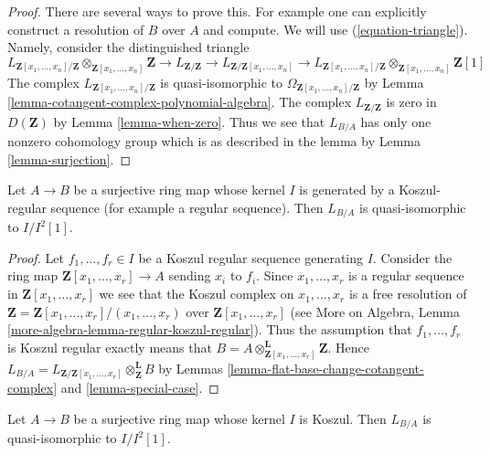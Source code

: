 \begin{proof}
There are several ways to prove this. For example one can explicitly construct
a resolution of $B$ over $A$ and compute. We will use (\ref{equation-triangle}).
Namely, consider the distinguished triangle
$$
L_{\mathbf{Z}[x_1, \ldots, x_n]/\mathbf{Z}}
\otimes_{\mathbf{Z}[x_1, \ldots, x_n]} \mathbf{Z} \to
L_{\mathbf{Z}/\mathbf{Z}} \to
L_{\mathbf{Z}/\mathbf{Z}[x_1, \ldots, x_n]}\to
L_{\mathbf{Z}[x_1, \ldots, x_n]/\mathbf{Z}}
\otimes_{\mathbf{Z}[x_1, \ldots, x_n]} \mathbf{Z}[1]
$$
The complex $L_{\mathbf{Z}[x_1, \ldots, x_n]/\mathbf{Z}}$
is quasi-isomorphic to $\Omega_{\mathbf{Z}[x_1, \ldots, x_n]/\mathbf{Z}}$ by
Lemma \ref{lemma-cotangent-complex-polynomial-algebra}.
The complex $L_{\mathbf{Z}/\mathbf{Z}}$ is zero in $D(\mathbf{Z})$ by
Lemma \ref{lemma-when-zero}.
Thus we see that $L_{B/A}$ has only one nonzero cohomology group
which is as described in the lemma by Lemma \ref{lemma-surjection}.
\end{proof}

\begin{lemma}
\label{lemma-mod-regular-sequence}
Let $A \to B$ be a surjective ring map whose kernel $I$ is generated
by a Koszul-regular sequence (for example a regular sequence).
Then $L_{B/A}$ is quasi-isomorphic to $I/I^2[1]$.
\end{lemma}

\begin{proof}
Let $f_1, \ldots, f_r \in I$ be a Koszul regular sequence generating $I$.
Consider the ring map $\mathbf{Z}[x_1, \ldots, x_r] \to A$ sending
$x_i$ to $f_i$. Since $x_1, \ldots, x_r$ is a regular sequence in
$\mathbf{Z}[x_1, \ldots, x_r]$ we see that the Koszul complex
on $x_1, \ldots, x_r$ is a free resolution of
$\mathbf{Z} = \mathbf{Z}[x_1, \ldots, x_r]/(x_1, \ldots, x_r)$
over $\mathbf{Z}[x_1, \ldots, x_r]$
(see More on Algebra, Lemma \ref{more-algebra-lemma-regular-koszul-regular}).
Thus the assumption that $f_1, \ldots, f_r$ is Koszul regular
exactly means that
$B = A \otimes_{\mathbf{Z}[x_1, \ldots, x_r]}^\mathbf{L} \mathbf{Z}$.
Hence
$L_{B/A} = L_{\mathbf{Z}/\mathbf{Z}[x_1, \ldots, x_r]}
\otimes_\mathbf{Z}^\mathbf{L} B$ by
Lemmas \ref{lemma-flat-base-change-cotangent-complex} and
\ref{lemma-special-case}.
\end{proof}

\begin{lemma}
\label{lemma-mod-Koszul-regular-ideal}
Let $A \to B$ be a surjective ring map whose kernel $I$ is Koszul.
Then $L_{B/A}$ is quasi-isomorphic to $I/I^2[1]$.
\end{lemma}

